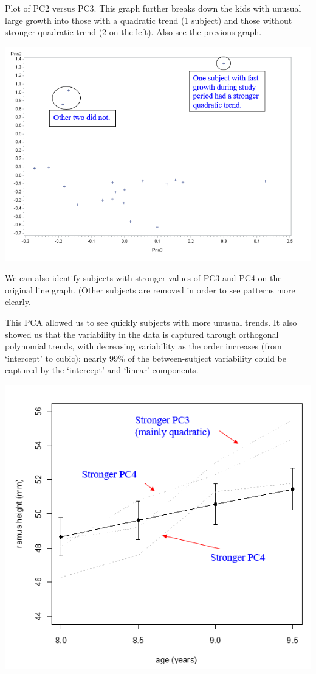 \documentclass[
  9pt,
  ignorenonframetext,
]{beamer}
\begin{document}
\begin{frame}{}
\protect\hypertarget{section-19}{}
Plot of PC2 versus PC3. This graph further breaks down the kids with
unusual large growth into those with a quadratic trend (1 subject) and
those without stronger quadratic trend (2 on the left). Also see the
previous graph.

\tiny

\begin{center}\includegraphics[width=0.6\linewidth]{figs_L2/f24} \end{center}

\tiny
\end{frame}

\begin{frame}{}
\protect\hypertarget{section-20}{}
We can also identify subjects with stronger values of PC3 and PC4 on the
original line graph. (Other subjects are removed in order to see
patterns more clearly.

This PCA allowed us to see quickly subjects with more unusual trends. It
also showed us that the variability in the data is captured through
orthogonal polynomial trends, with decreasing variability as the order
increases (from `intercept' to cubic); nearly 99\% of the
between-subject variability could be captured by the `intercept' and
`linear' components.

\tiny

\begin{center}\includegraphics[width=0.6\linewidth]{figs_L2/f25} \end{center}

\tiny
\end{frame}
\end{document}
